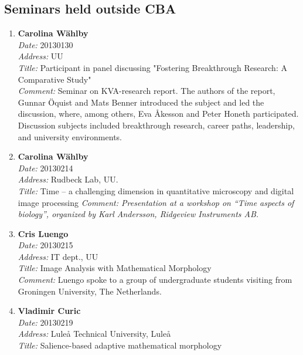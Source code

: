 \subsection{Seminars held outside CBA}
\begin{enumerate}
\item%
{\bf Carolina W\"{a}hlby}~\\
{\em Date:} 20130130~\\
{\em Address:} UU~\\
{\em Title:} Participant in panel discussing "Fostering Breakthrough Research: A Comparative Study"~\\
{\em Comment:} Seminar on KVA-research report. The authors of the report, Gunnar \"{O}quist and Mats Benner introduced the subject and led the discussion, where, among others, Eva \AA kesson and Peter Honeth participated. Discussion subjects included breakthrough research, career paths, leadership, and university environments.

\item 
{\bf Carolina W\"{a}hlby}~\\
{\em Date:} 20130214~\\
{\em Address:} Rudbeck Lab, UU.~\\
{\em Title:} Time -- a challenging dimension in quantitative microscopy and digital image processing
{\em Comment: Presentation at a workshop on ``Time aspects of biology'', organized by Karl Andersson, Ridgeview Instruments AB.}

\item 
{\bf Cris Luengo}~\\
{\em Date:} 20130215~\\
{\em Address:} IT dept., UU~\\
{\em Title:} Image Analysis with Mathematical Morphology~\\
{\em Comment:} Luengo spoke to a group of undergraduate students visiting from Groningen University, The Netherlands.


\item 
{\bf Vladimir Curic}~\\
{\em Date:} 20130219~\\
{\em Address:} Lule{\aa} Technical University, Lule{\aa} ~\\
{\em Title:} Salience-based adaptive mathematical morphology


\end{enumerate}
